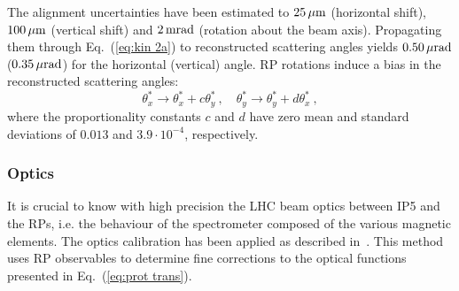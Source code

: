 The alignment uncertainties have been estimated to $25\,{\rm \mu m}$ (horizontal shift), $100\,{\rm \mu m}$ (vertical shift) and $2\,{\rm m rad}$ (rotation about the beam axis). Propagating them through Eq.~(\ref{eq:kin 2a}) to reconstructed scattering angles yields $0.50\,{\rm \mu rad}$ ($0.35\,{\rm \mu rad}$) for the horizontal (vertical) angle. RP rotations induce a bias in the reconstructed scattering angles:
\begin{equation}
\label{eq:alig rot bias}
	\theta_x^* \rightarrow \theta_x^* + c \theta_y^*\ ,\quad
	\theta_y^* \rightarrow \theta_y^* + d \theta_x^*\ ,
\end{equation}
where the proportionality constants $c$ and $d$ have zero mean and standard deviations of $0.013$ and $3.9\cdot10^{-4}$, respectively.




\subsubsection{Optics}
\label{sec:optics}

It is crucial to know with high precision the LHC beam optics between IP5 and the RPs, i.e. the behaviour of the spectrometer composed of the various magnetic elements. The optics calibration has been applied as described in~\cite{totem-optics}. This method uses RP observables to determine fine corrections to the optical functions presented in Eq.~(\ref{eq:prot trans}).

